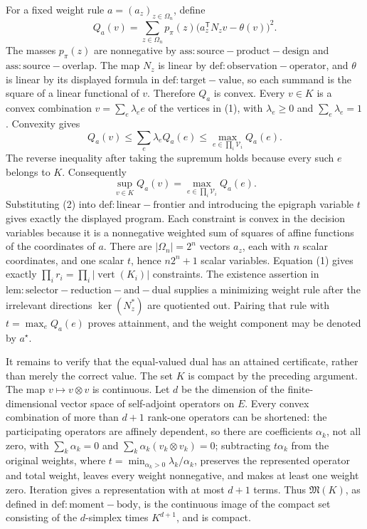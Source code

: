 For a fixed weight rule \(a=(a_z)_{z\in\Omega_n}\), define
\[
 Q_a(v)=\sum_{z\in\Omega_n}p_{\pi}(z)
 \bigl(a_z^{\mathsf T}N_zv-\theta(v)\bigr)^2.
\]
The masses \(p_{\pi}(z)\) are nonnegative by \(\mathrm{ass:source-product-design}\) and \(\mathrm{ass:source-overlap}\).  The map \(N_z\) is linear by \(\mathrm{def:observation-operator}\), and \(\theta\) is linear by its displayed formula in \(\mathrm{def:target-value}\), so each summand is the square of a linear functional of \(v\).  Therefore \(Q_a\) is convex.  Every \(v\in K\) is a convex combination \(v=\sum_e\lambda_e e\) of the vertices in (1), with \(\lambda_e\ge0\) and \(\sum_e\lambda_e=1\).  Convexity gives
\[
 Q_a(v)\le\sum_e\lambda_eQ_a(e)
 \le\max_{e\in\prod_i\mathcal V_i}Q_a(e).
\]
The reverse inequality after taking the supremum holds because every such \(e\) belongs to \(K\).  Consequently
\[
 \sup_{v\in K}Q_a(v)
 =\max_{e\in\prod_i\mathcal V_i}Q_a(e). \tag{2}
\]
Substituting (2) into \(\mathrm{def:linear-frontier}\) and introducing the epigraph variable \(t\) gives exactly the displayed program.  Each constraint is convex in the decision variables because it is a nonnegative weighted sum of squares of affine functions of the coordinates of \(a\).  There are \(|\Omega_n|=2^n\) vectors \(a_z\), each with \(n\) scalar coordinates, and one scalar \(t\), hence \(n2^n+1\) scalar variables.  Equation (1) gives exactly \(\prod_i r_i=\prod_i|\operatorname{vert}(K_i)|\) constraints.  The existence assertion in \(\mathrm{lem:selector-reduction-and-dual}\) supplies a minimizing weight rule after the irrelevant directions \(\ker(N_z^{\ast})\) are quotiented out.  Pairing that rule with \(t=\max_eQ_a(e)\) proves attainment, and the weight component may be denoted by \(a^{\star}\).

It remains to verify that the equal-valued dual has an attained certificate, rather than merely the correct value.  The set \(K\) is compact by the preceding argument.  The map \(v\mapsto v\otimes v\) is continuous.  Let \(d\) be the dimension of the finite-dimensional vector space of self-adjoint operators on \(E\).  Every convex combination of more than \(d+1\) rank-one operators can be shortened: the participating operators are affinely dependent, so there are coefficients \(\alpha_k\), not all zero, with \(\sum_k\alpha_k=0\) and \(\sum_k\alpha_k(v_k\otimes v_k)=0\); subtracting \(t\alpha_k\) from the original weights, where \(t=\min_{\alpha_k>0}\lambda_k/\alpha_k\), preserves the represented operator and total weight, leaves every weight nonnegative, and makes at least one weight zero.  Iteration gives a representation with at most \(d+1\) terms.  Thus \(\mathfrak M(K)\), as defined in \(\mathrm{def:moment-body}\), is the continuous image of the compact set consisting of the \(d\)-simplex times \(K^{d+1}\), and is compact.

